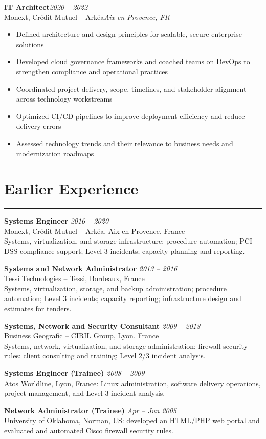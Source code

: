 \documentclass[10pt,a4paper]{article}
\newcommand{\sectionrule}{\noindent\rule{\linewidth}{0.4pt}\par\vspace{0.24em}}
\newcommand{\job}[5]{%
  {\textbf{#1}}\hfill{\textit{#2}}\\
  {#3}\hfill{\textit{#4}}\\
  \begin{itemize}
    #5
  \end{itemize}
}
\begin{document}
\job{IT Architect}{2020 -- 2022}{Monext, Crédit Mutuel -- Arkéa}{Aix-en-Provence, FR}{
  \item Defined architecture and design principles for scalable, secure enterprise solutions
  \item Developed cloud governance frameworks and coached teams on DevOps to strengthen compliance and operational practices
  \item Coordinated project delivery, scope, timelines, and stakeholder alignment across technology workstreams
  \item Optimized CI/CD pipelines to improve deployment efficiency and reduce delivery errors
  \item Assessed technology trends and their relevance to business needs and modernization roadmaps
}

\newpage
\section*{Earlier Experience}
\sectionrule
\textbf{Systems Engineer} \hfill \textit{2016 -- 2020}\\
Monext, Crédit Mutuel -- Arkéa, Aix-en-Provence, France\\
Systems, virtualization, and storage infrastructure; procedure automation; PCI-DSS compliance support; Level 3 incidents; capacity planning and reporting.

\textbf{Systems and Network Administrator} \hfill \textit{2013 -- 2016}\\
Tessi Technologies -- Tessi, Bordeaux, France\\
Systems, virtualization, storage, and backup administration; procedure automation; Level 3 incidents; capacity reporting; infrastructure design and estimates for tenders.

\textbf{Systems, Network and Security Consultant} \hfill \textit{2009 -- 2013}\\
Business Geografic -- CIRIL Group, Lyon, France\\
Systems, network, virtualization, and storage administration; firewall security rules; client consulting and training; Level 2/3 incident analysis.

\textbf{Systems Engineer (Trainee)} \hfill \textit{2008 -- 2009}\\
Atos Worldline, Lyon, France: Linux administration, software delivery operations, project management, and Level 3 incident analysis.

\textbf{Network Administrator (Trainee)} \hfill \textit{Apr -- Jun 2005}\\
University of Oklahoma, Norman, US: developed an HTML/PHP web portal and evaluated and automated Cisco firewall security rules.
\end{document}

